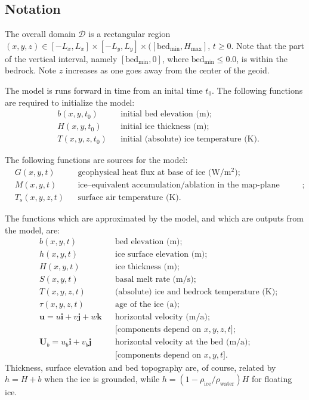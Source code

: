 \documentclass[12pt,final]{amsart}%
\theoremstyle{plain}
\theoremstyle{definition}
\theoremstyle{remark}
\newcommand{\ihat}{\mathbf{i}}
\newcommand{\jhat}{\mathbf{j}}
\newcommand{\khat}{\mathbf{k}}
\newcommand{\bu}{{\mathbf{u}}}
\newcommand{\bU}{{\mathbf{U}}}
\begin{document}
\subsection*{Notation}  The overall domain $\mathcal{D}$ is a rectangular region $(x,y,z)\in [-L_x,L_x]\times [-L_y,L_y]\times([\text{bed}_{\text{min}},H_{\text{max}}]$, $t\ge 0$.  Note that the part of the vertical interval, namely $[\text{bed}_{\text{min}},0]$, where $\text{bed}_{\text{min}} \le 0.0$, is within the bedrock.  Note $z$ increases as one goes away from the center of the geoid.

The model is runs forward in time from an inital time $t_0$.  The following functions are required to initialize the model:
\begin{align*}
&b(x,y,t_0) &&\text{initial bed elevation (m)}; \\
&H(x,y,t_0) &&\text{initial ice thickness (m)};\\
&T(x,y,z,t_0) &&\text{initial (absolute) ice temperature (K)}.
\end{align*}

The following functions are sources for the model:
\begin{align*}
&G(x,y,t) &&\text{geophysical heat flux at base of ice (W/$\text{m}^2$)};\\
&M(x,y,t) &&\text{ice--equivalent accumulation/ablation in the map-plane (m/a)};\\
&T_s(x,y,z,t) &&\text{surface air temperature (K)}.
\end{align*}

The functions which are approximated by the model, and which are outputs from the model, are:
\begin{align*}
&b(x,y,t) &&\text{bed elevation (m)}; \\
&h(x,y,t) &&\text{ice surface elevation (m)};\\
&H(x,y,t) &&\text{ice thickness (m)};\\
&S(x,y,t) &&\text{basal melt rate (m/s);}\\
&T(x,y,z,t) &&\text{(absolute) ice and bedrock temperature (K)};\\
&\tau(x,y,z,t) &&\text{age of the ice (a)};\\
&\bu=u\ihat+v\jhat+w\khat &&\text{horizontal velocity (m/a);}\\
&&& \text{[components depend on } x,y,z,t];\\
&\bU_b=u_b\ihat+v_b\jhat &&\text{horizontal velocity at the bed (m/a);}\\
&&& \text{[components depend on } x,y,t].
\end{align*}
Thickness, surface elevation and bed topography are, of course, related by $h=H+b$ when the ice is grounded, while $h = (1-\rho_{\text{ice}}/\rho_{\text{water}}) H$ for floating ice.
\end{document}
